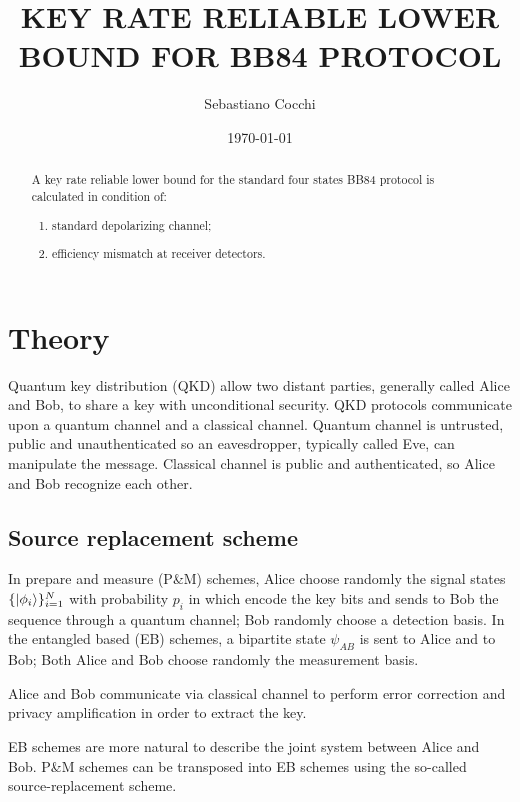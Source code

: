 \documentclass{article}
\title{KEY RATE RELIABLE LOWER BOUND FOR BB84 PROTOCOL}
\author{Sebastiano Cocchi }
\date{\today}
\begin{document}
\maketitle

\begin{abstract}                %
    A key rate reliable lower bound for the standard four states BB84 protocol is calculated in condition of:
    \begin{enumerate}
        \item standard depolarizing channel;
        \item efficiency mismatch at receiver detectors.
    \end{enumerate}
\end{abstract}

\tableofcontents

\section{Theory}
Quantum key distribution (QKD) allow two distant parties, generally called Alice and Bob, to share a key with unconditional security.
QKD protocols communicate upon a quantum channel and a classical channel.
Quantum channel is untrusted, public and unauthenticated so an eavesdropper, typically called Eve, can manipulate the message. 
Classical channel is public and authenticated, so Alice and Bob recognize each other.
    \subsection{Source replacement scheme}
    In prepare and measure (P\&M) schemes, Alice choose randomly the signal states \(\{\ket{\phi_i}\}_{i=1}^N\) with probability \(p_i\) in which encode the key bits and sends to Bob the sequence through a quantum channel;
    Bob randomly choose a detection basis.
    In the entangled based (EB) schemes, a bipartite state \(\psi_{AB}\) is sent to Alice and to Bob; Both Alice and Bob choose randomly the measurement basis.

    Alice and Bob communicate via classical channel to perform error correction and privacy amplification in order to extract the key.

    EB schemes are more natural to describe the joint system between Alice and Bob.
    P\&M schemes can be transposed into EB schemes using the so-called source-replacement scheme.
\end{document}

